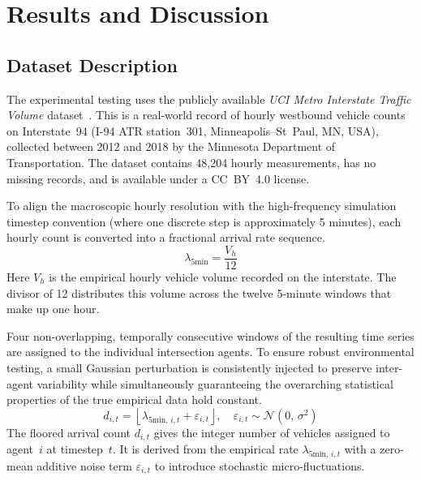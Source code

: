 \documentclass[journal]{IEEEtran}
\begin{document}
\section{Results and Discussion}
\label{sec:results}

\subsection{Dataset Description}
\label{sec:sim_settings}
The experimental testing uses the publicly available \emph{UCI Metro Interstate Traffic Volume} dataset~\cite{ucidataset}. This is a real-world record of hourly westbound vehicle counts on Interstate~94 (I-94 ATR station~301, Minneapolis--St~Paul, MN, USA), collected between 2012 and 2018 by the Minnesota Department of Transportation. The dataset contains 48,204 hourly measurements, has no missing records, and is available under a CC~BY~4.0 license.

To align the macroscopic hourly resolution with the high-frequency simulation timestep convention (where one discrete step is approximately 5 minutes), each hourly count is converted into a fractional arrival rate sequence.
\begin{equation}
    \lambda_{\text{5min}} = \frac{V_h}{12}
    \label{eq:rate_conversion}
\end{equation}
Here $V_h$ is the empirical hourly vehicle volume recorded on the interstate. The divisor of 12 distributes this volume across the twelve 5-minute windows that make up one hour.

Four non-overlapping, temporally consecutive windows of the resulting time series are assigned to the individual intersection agents. To ensure robust environmental testing, a small Gaussian perturbation is consistently injected to preserve inter-agent variability while simultaneously guaranteeing the overarching statistical properties of the true empirical data hold constant.
\begin{equation}
    d_{i,t} = \left\lfloor \lambda_{\text{5min},\,i,t} + \varepsilon_{i,t} \right\rfloor,
    \quad \varepsilon_{i,t} \sim \mathcal{N}(0,\,\sigma^2)
    \label{eq:real_demand}
\end{equation}
The floored arrival count $d_{i,t}$ gives the integer number of vehicles assigned to agent~$i$ at timestep~$t$. It is derived from the empirical rate $\lambda_{\text{5min},\,i,t}$ with a zero-mean additive noise term $\varepsilon_{i,t}$ to introduce stochastic micro-fluctuations.
\end{document}
